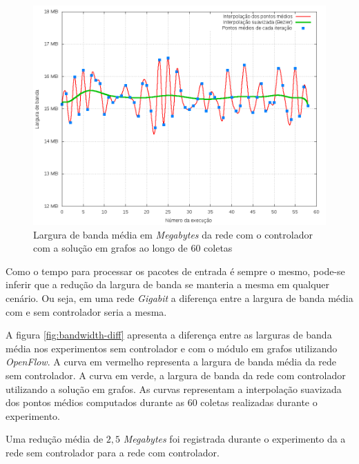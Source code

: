 \begin{figure}[!htb]
    \centering
    \label{fig:bandwidth-ctrl}
    \includegraphics[width=\linewidth]{img/bandwidth-ctrl}
    \caption{Largura de banda média em \emph{Megabytes} da rede com o 
        controlador com a solução em grafos ao longo de 60 coletas}
\end{figure}

Como o tempo para processar os pacotes de entrada é sempre o mesmo, pode-se 
inferir que a redução da largura de banda se manteria a mesma em qualquer 
cenário.
Ou seja, em uma rede \emph{Gigabit} a diferença entre a largura de banda 
média com e sem controlador seria a mesma.

A figura \ref{fig:bandwidth-diff} apresenta a diferença entre as larguras de
banda média nos experimentos sem controlador e com o  módulo em grafos 
utilizando \emph{OpenFlow}.
A curva em vermelho representa a largura de banda média da rede sem 
controlador.
A curva em verde, a largura de banda da rede com controlador utilizando a 
solução em grafos.
As curvas representam a interpolação suavizada dos pontos médios computados
durante as 60 coletas realizadas durante o experimento.

Uma redução média de $2,5$ \emph{Megabytes} foi registrada durante o 
experimento da a rede sem controlador para a rede com controlador.

